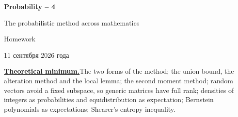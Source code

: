 \documentclass[11pt,a4paper]{article}
\begin{document}
\begin{center}
{\huge\bfseries Probability -- 4\par}\vspace{1.07em}
{\Large The probabilistic method across mathematics\par}\vspace{1.1em}
{\Large Homework\par}\vspace{1.1em}
{\foreignlanguage{russian}{11 сентября 2026 года}\par}
\end{center}\vspace{0pt}

\noindent\textbf{\underline{Theoretical minimum.}}\quad The two forms of the method; the union bound,
the alteration method and the local lemma; the second moment method; random vectors avoid a fixed
subspace, so generic matrices have full rank; densities of integers as probabilities and
equidistribution as expectation; Bernstein polynomials as expectations; Shearer's entropy inequality.
\end{document}
